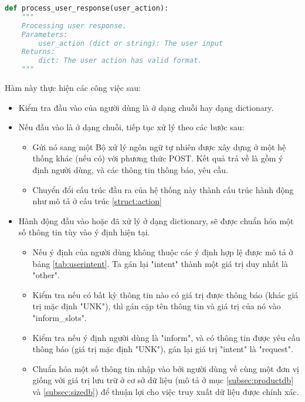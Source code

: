\renewcommand{\lstlistingname}{Hàm}
\begin{lstlisting}[caption={Hàm xử lý phản hồi người dùng},label={func:processuser},language=python,firstnumber=1]
def process_user_response(user_action):
    """
    Processing user response.
    Parameters:
        user_action (dict or string): The user input
    Returns:
        dict: The user action has valid format.
    """
\end{lstlisting}

Hàm này thực hiện các công việc sau:

\begin{itemize}
    \item Kiểm tra đầu vào của người dùng là ở dạng chuỗi hay dạng dictionary.
    \item Nếu đầu vào là ở dạng chuỗi, tiếp tục xử lý theo các bước sau:
    \begin{itemize}
        \item Gửi nó sang một Bộ xử lý ngôn ngữ tự nhiên được xây dựng ở một hệ thống khác (nếu có) với phương thức POST. Kết quả trả về là gồm ý định người dùng, và các thông tin thông báo, yêu cầu.
        \item Chuyển đổi cấu trúc đầu ra của hệ thống này thành cấu trúc hành động như mô tả ở cấu trúc \ref{struct:action}
    \end{itemize}
    \item Hành động đầu vào hoặc đã xử lý ở dạng dictionary,  sẽ được chuẩn hóa một số thông tin tùy vào ý định hiện tại.
    \begin{itemize}
        \item Nếu ý định của người dùng không thuộc các ý định hợp lệ được mô tả ở bảng \ref{tab:userintent}. Ta gán lại "intent" thành một giá trị duy nhất là "other".
        \item Kiểm tra nếu có bất kỳ thông tin nào có giá trị được thông báo (khác giá trị mặc định "UNK"), thì gán cặp tên thông tin và giá trị của nó vào "inform\_slots".
        \item Kiểm tra nếu ý định người dùng là "inform", và có thông tin được yêu cầu thông báo (giá trị mặc định "UNK"), gán lại giá trị "intent" là "request".
        \item Chuẩn hóa một số thông tin nhập vào bởi người dùng về cùng một đơn vị giống với giá trị lưu trữ ở cơ sở dữ liệu (mô tả ở mục \ref{subsec:productdb} và \ref{subsec:sizedb}) để thuận lợi cho việc truy xuất dữ liệu được chính xác. 
    \end{itemize}
\end{itemize}

